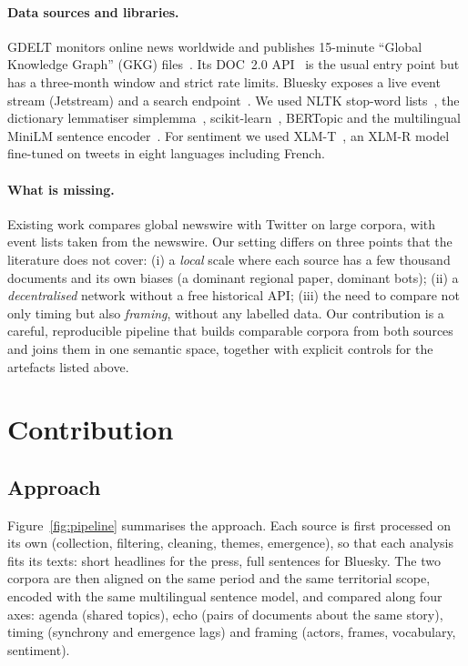 \documentclass[pdflatex,sn-mathphys-num]{sn-jnl}
\begin{document}
\paragraph{Data sources and libraries.} GDELT monitors online news worldwide and publishes 15-minute ``Global Knowledge Graph'' (GKG) files~\cite{leetaru2013gdelt}. Its DOC~2.0 API~\cite{gdeltdoc2017} is the usual entry point but has a three-month window and strict rate limits. Bluesky exposes a live event stream (Jetstream) and a search endpoint~\cite{bskyapi}. We used NLTK stop-word lists~\cite{bird2009nltk}, the dictionary lemmatiser simplemma~\cite{barbaresi2023simplemma}, scikit-learn~\cite{pedregosa2011sklearn}, BERTopic and the multilingual MiniLM sentence encoder~\cite{reimers2020multilingual}. For sentiment we used XLM-T~\cite{barbieri2022xlmt}, an XLM-R model~\cite{conneau2020xlmr} fine-tuned on tweets in eight languages including French.

\paragraph{What is missing.} Existing work compares global newswire with Twitter on large corpora, with event lists taken from the newswire. Our setting differs on three points that the literature does not cover: (i) a \emph{local} scale where each source has a few thousand documents and its own biases (a dominant regional paper, dominant bots); (ii) a \emph{decentralised} network without a free historical API; (iii) the need to compare not only timing but also \emph{framing}, without any labelled data. Our contribution is a careful, reproducible pipeline that builds comparable corpora from both sources and joins them in one semantic space, together with explicit controls for the artefacts listed above.

\section{Contribution}\label{sec:contrib}

\subsection{Approach}\label{sec:approach}

Figure~\ref{fig:pipeline} summarises the approach. Each source is first processed on its own (collection, filtering, cleaning, themes, emergence), so that each analysis fits its texts: short headlines for the press, full sentences for Bluesky. The two corpora are then aligned on the same period and the same territorial scope, encoded with the same multilingual sentence model, and compared along four axes: agenda (shared topics), echo (pairs of documents about the same story), timing (synchrony and emergence lags) and framing (actors, frames, vocabulary, sentiment).
\end{document}
